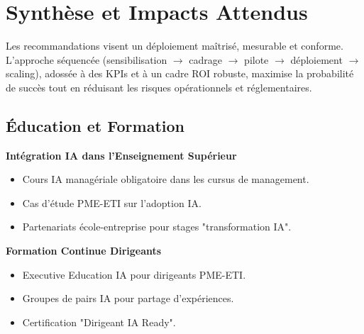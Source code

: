 \section{Synthèse et Impacts Attendus}
Les recommandations visent un déploiement maîtrisé, mesurable et conforme. L’approche séquencée (sensibilisation \(\rightarrow\) cadrage \(\rightarrow\) pilote \(\rightarrow\) déploiement \(\rightarrow\) scaling), adossée à des KPIs et à un cadre ROI robuste, maximise la probabilité de succès tout en réduisant les risques opérationnels et réglementaires.

\subsection{Éducation et Formation}

\textbf{Intégration IA dans l'Enseignement Supérieur}
\begin{itemize}
    \item Cours IA managériale obligatoire dans les cursus de management.
    \item Cas d'étude PME-ETI sur l'adoption IA.
    \item Partenariats école-entreprise pour stages "transformation IA".
\end{itemize}

\textbf{Formation Continue Dirigeants}
\begin{itemize}
    \item Executive Education IA pour dirigeants PME-ETI.
    \item Groupes de pairs IA pour partage d'expériences.
    \item Certification "Dirigeant IA Ready".
\end{itemize}
